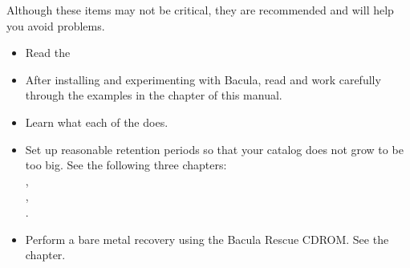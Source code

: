 Although these items may not be critical, they are recommended and will help
you avoid problems. 

\begin{itemize}
\item Read the  
\item After installing and experimenting with Bacula, read and work carefully 
   through the examples in the 
    chapter  of this manual. 
\item Learn what each of the   does. 
\item Set up reasonable retention periods so that your catalog does not  grow
   to be too big. See the following three chapters:\\
   ,\\
   ,\\
   . 
\item Perform a bare metal recovery using the Bacula Rescue CDROM.  See the 
    chapter. 
   \end{itemize}
